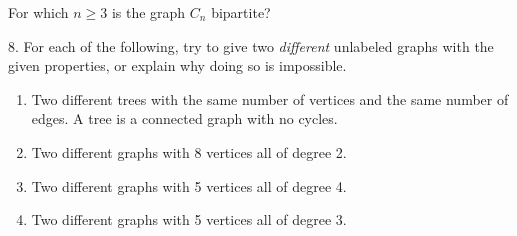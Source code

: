\documentclass[10pt,]{book}
\theoremstyle{plain}
\theoremstyle{definition}
\theoremstyle{definition}
\theoremstyle{definition}
\theoremstyle{definition}
\numberwithin{equation}{chapter}
\begin{document}
\begin{exerciselist}
For which \(n \ge 3\) is the graph \(C_n\) bipartite?%
\par\smallskip
\item[8.]\hypertarget{exercise-178}{}\hypertarget{p-1577}{}%
For each of the following, try to give two \emph{different} unlabeled graphs with the given properties, or explain why doing so is impossible. \leavevmode%
\begin{enumerate}[label=(\alph*)]
\item\hypertarget{li-711}{}\hypertarget{p-1578}{}%
Two different trees with the same number of vertices and the same number of edges. A tree is a connected graph with no cycles.%
\item\hypertarget{li-712}{}\hypertarget{p-1579}{}%
Two different graphs with 8 vertices all of degree 2.%
\item\hypertarget{li-713}{}\hypertarget{p-1580}{}%
Two different graphs with 5 vertices all of degree 4.%
\item\hypertarget{li-714}{}\hypertarget{p-1581}{}%
Two different graphs with 5 vertices all of degree 3.%
\end{enumerate}
%
\par\smallskip
\end{exerciselist}
\typeout{************************************************}
\typeout{************************************************}
\end{document}
